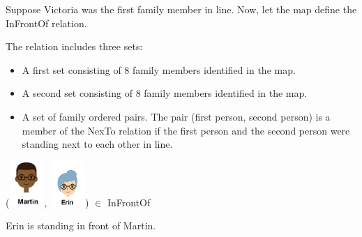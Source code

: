 \documentclass{ximera}
\begin{document}
\begin{exercise}

Suppose Victoria was the first family member in line. Now, let the map define the InFrontOf relation.

  \begin{definition}
  The  relation includes three sets:
    \begin{itemize}
    \item A first set consisting of 8 family members identified in the map.
    \item A second set consisting of 8 family members identified in the map.
    \item A set of family ordered pairs. The pair (first person, second person) is a member of the NexTo relation if the first person and the second person were standing next to each other in line.
    \end{itemize}
  \end{definition}


 ({\includegraphics[width=50px,height=65px]{pics/people/martin.png}}, {\includegraphics[width=50px,height=65px]{pics/people/erin.png}}) $\in$ InFrontOf 

  \begin{multipleChoice}
  \end{multipleChoice}
  \begin{feedback}
Erin is standing in front of Martin.
  \end{feedback}
\end{exercise}
\end{document}
